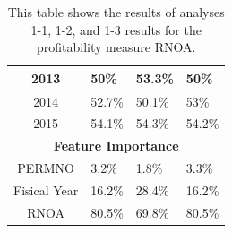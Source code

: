 {{\begin{table}[htb]
\begin{tabular}{clll}
\multicolumn{1}{|c|}{2013}                           & \multicolumn{1}{l|}{50\%}                & \multicolumn{1}{l|}{53.3\%}                      & \multicolumn{1}{l|}{50\%}                          \\ \hline
\multicolumn{1}{|c|}{2014}                           & \multicolumn{1}{l|}{52.7\%}              & \multicolumn{1}{l|}{50.1\%}                      & \multicolumn{1}{l|}{53\%}                          \\ \hline
\multicolumn{1}{|c|}{2015}                           & \multicolumn{1}{l|}{54.1\%}              & \multicolumn{1}{l|}{54.3\%}                      & \multicolumn{1}{l|}{54.2\%}                        \\ \hline
\multicolumn{4}{|c|}{\textbf{Feature Importance}}                                                                                                                                                       \\ \hline
\multicolumn{1}{|c|}{PERMNO}                         & \multicolumn{1}{l|}{3.2\%}               & \multicolumn{1}{l|}{1.8\%}                       & \multicolumn{1}{l|}{3.3\%}                         \\ \hline
\multicolumn{1}{|c|}{Fisical Year}                   & \multicolumn{1}{l|}{16.2\%}              & \multicolumn{1}{l|}{28.4\%}                      & \multicolumn{1}{l|}{16.2\%}                        \\ \hline
\multicolumn{1}{|c|}{RNOA}                           & \multicolumn{1}{l|}{80.5\%}              & \multicolumn{1}{l|}{69.8\%}                      & \multicolumn{1}{l|}{80.5\%}                        \\ \hline
\end{tabular}
\caption{This table shows the results of analyses 1-1, 1-2, and 1-3 results for the profitability measure RNOA.}
\label{tab:RNOA-1}
\end{table}

}}
